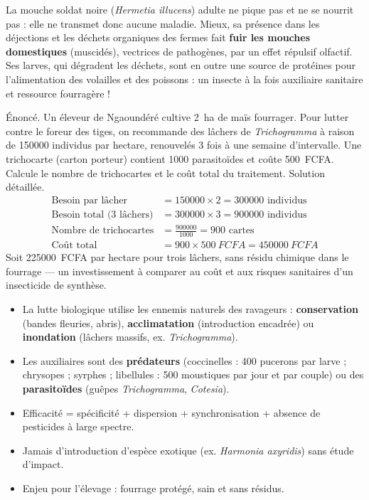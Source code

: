 \documentclass[11pt]{article}
\begin{document}
\begin{savaistu}
La mouche soldat noire (\emph{Hermetia illucens}) adulte ne pique pas et ne se nourrit pas : elle ne transmet donc aucune maladie. Mieux, sa présence dans les déjections et les déchets organiques des fermes fait \textbf{fuir les mouches domestiques} (muscidés), vectrices de pathogènes, par un effet répulsif olfactif. Ses larves, qui dégradent les déchets, sont en outre une source de protéines pour l'alimentation des volailles et des poissons : un insecte à la fois auxiliaire sanitaire et ressource fourragère !
\end{savaistu}

\begin{exoresolu}
Énoncé. Un éleveur de Ngaoundéré cultive \SI{2}{ha} de maïs fourrager. Pour lutter contre le foreur des tiges, on recommande des lâchers de \emph{Trichogramma} à raison de \num{150000} individus par hectare, renouvelés \num{3} fois à une semaine d'intervalle. Une trichocarte (carton porteur) contient \num{1000} parasitoïdes et coûte \SI{500}{FCFA}. Calcule le nombre de trichocartes et le coût total du traitement.
\tcblower
Solution détaillée.
\begin{align*}
\text{Besoin par lâcher} &= \num{150000} \times 2 = \num{300000} \text{ individus}\\
\text{Besoin total (3 lâchers)} &= \num{300000} \times 3 = \num{900000} \text{ individus}\\
\text{Nombre de trichocartes} &= \frac{\num{900000}}{\num{1000}} = \num{900} \text{ cartes}\\
\text{Coût total} &= \num{900} \times \SI{500}{FCFA} = \SI{450000}{FCFA}
\end{align*}
Soit \SI{225000}{FCFA} par hectare pour trois lâchers, sans résidu chimique dans le fourrage — un investissement à comparer au coût et aux risques sanitaires d'un insecticide de synthèse.
\end{exoresolu}

\begin{aretenir}
\begin{itemize}
\item La lutte biologique utilise les ennemis naturels des ravageurs : \textbf{conservation} (bandes fleuries, abris), \textbf{acclimatation} (introduction encadrée) ou \textbf{inondation} (lâchers massifs, ex. \emph{Trichogramma}).
\item Les auxiliaires sont des \textbf{prédateurs} (coccinelles : \num{400} pucerons par larve ; chrysopes ; syrphes ; libellules : \num{500} moustiques par jour et par couple) ou des \textbf{parasitoïdes} (guêpes \emph{Trichogramma}, \emph{Cotesia}).
\item Efficacité = spécificité + dispersion + synchronisation + absence de pesticides à large spectre.
\item Jamais d'introduction d'espèce exotique (ex. \emph{Harmonia axyridis}) sans étude d'impact.
\item Enjeu pour l'élevage : fourrage protégé, sain et sans résidus.
\end{itemize}
\end{aretenir}
\end{document}

